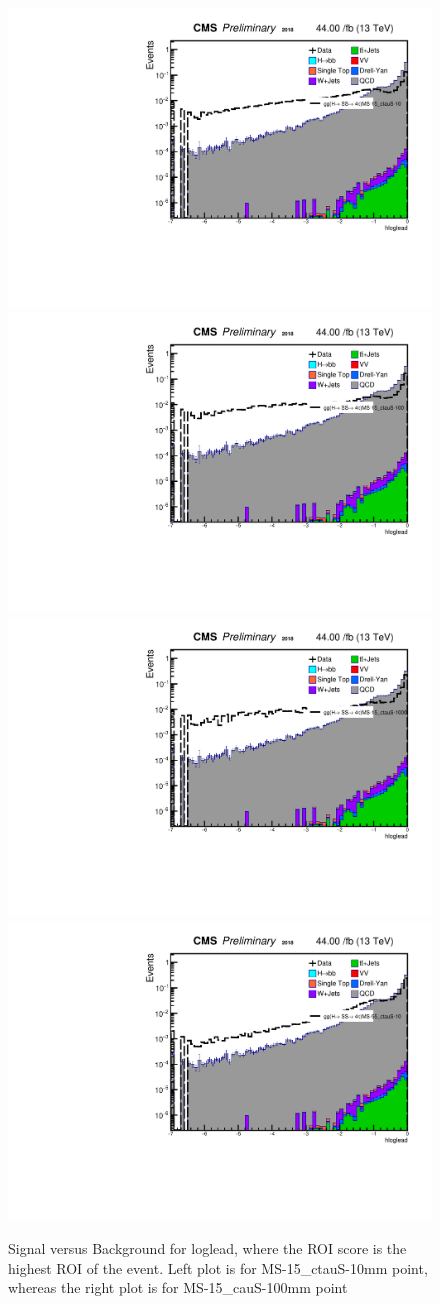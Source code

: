 \begin{figure}[h!]
   \label{fig:leadROIscore}
   \centering
   \includegraphics[width=0.47\linewidth]{figs/log_Oct6ANVars_MS-15_ctauS-10_hloglead.pdf}
   \includegraphics[width=0.47\linewidth]{figs/log_Oct6ANVars_MS-15_ctauS-100_hloglead.pdf}
   \includegraphics[width=0.47\linewidth]{figs/log_Oct6ANVars_MS-15_ctauS-1000_hloglead.pdf}
   \includegraphics[width=0.47\linewidth]{figs/log_Oct6ANVars_MS-55_ctauS-10_hloglead.pdf}
   \caption{Signal versus Background for loglead, where the ROI score is the highest ROI of the event. Left plot is for MS-15\_ctauS-10mm point, whereas the right plot is for MS-15\_cauS-100mm point}
 \end{figure}


